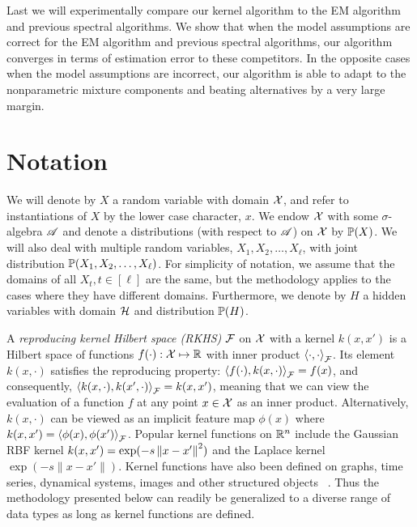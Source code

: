 \documentclass{article}
\begin{document}
Last we will experimentally compare our kernel algorithm to the EM algorithm and previous spectral algorithms. We show that when the model assumptions are correct for the EM algorithm and previous spectral algorithms, our algorithm converges in terms of estimation error to these competitors. In the opposite cases when the model assumptions are incorrect, our algorithm is able to adapt to the nonparametric mixture components and beating alternatives by a very large margin.

\section{Notation}

We will denote by $X$ a random variable with domain $\mathcal{X}$,
and refer to instantiations of $X$ by the lower case character, $x$.
We endow $\mathcal{X}$ with some $\sigma$-algebra $\mathscr{A}$ and denote a distributions (with respect to $\mathscr{A}$) on $\mathcal{X}$ by $\mathbb{P}(X)$. We will also deal with multiple random variables, $X_1, X_2, \ldots, X_{\ell}$, with joint distribution $\mathbb{P}(X_1,X_2,\ldots,X_{\ell})$. For simplicity of notation, we assume that the domains of all $X_t, t \in [\ell]$ are the same, but the methodology applies to the cases where they have different domains. Furthermore, we denote by $H$ a hidden variables with domain $\mathcal{H}$ and distribution $\mathbb{P}(H)$.

A \emph{reproducing kernel Hilbert space (RKHS)} $\mathcal{F}$ on $\mathcal{X}$ with a kernel $k(x,x')$ is a Hilbert space of
functions $f(\cdot):\mathcal{X} \mapsto \mathbb{R}$ with inner product $\left\langle \cdot,\cdot \right\rangle_{\mathcal{F}}$. Its element $k(x,\cdot)$ satisfies the reproducing property:
$\left\langle f(\cdot),k(x, \cdot) \right\rangle_{\mathcal{F}} = f(x)$, and consequently, $\left\langle k(x,\cdot),k(x', \cdot) \right\rangle_{\mathcal{F}} = k(x,x')$,
meaning that we can view the evaluation of a function $f$ at any point $x\in\mathcal{X}$ as an inner product. Alternatively, $k(x,\cdot)$ can  be viewed as an implicit feature map $\phi(x)$ where $k(x,x')=\left\langle \phi(x),\phi(x') \right\rangle_{\mathcal{F}}$.
Popular kernel functions on $\mathbb{R}^n$ include the Gaussian RBF kernel $k(x,x') = \exp(-s
  \left\|x-x'\right\|^2)$ and the Laplace kernel $\exp(-s \|x - x'\|)$. Kernel functions have also been defined on
graphs, time series, dynamical systems, images and other structured
objects \, \cite{SchTsuVer04}. Thus the methodology presented below can readily be generalized to a diverse range of data types as long as kernel functions are defined.
\end{document}
